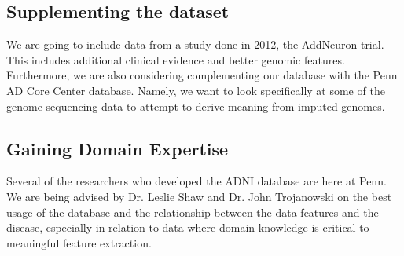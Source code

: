 \documentclass{article}
\begin{document}
\subsection{Supplementing the dataset}
We are going to include data from a study done in 2012, the AddNeuron trial. This includes additional clinical evidence and better genomic features. Furthermore, we are also considering complementing our database with the Penn AD Core Center database. Namely, we want to look specifically at some of the genome sequencing data to attempt to derive meaning from imputed genomes.

\subsection{Gaining Domain Expertise}
Several of the researchers who developed the ADNI database are here at Penn. We are being advised by Dr. Leslie Shaw and Dr. John Trojanowski on the best usage of the database and the relationship between the data features and the disease, especially in relation to data where domain knowledge is critical to meaningful feature extraction.



%
%
%
%
\end{document}
